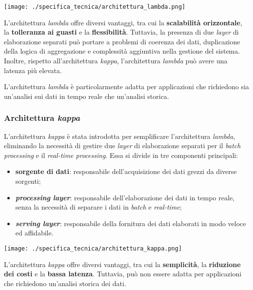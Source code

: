 \begin{center}
	\texttt{[image: ./specifica\_tecnica/architettura\_lambda.png]}
\end{center}

L'architettura \textit{lambda} offre diversi vantaggi, tra cui la \textbf{scalabilità orizzontale}, la \textbf{tolleranza ai guasti} e la \textbf{flessibilità}. Tuttavia, la presenza
di due \textit{layer} di elaborazione separati può portare a problemi di coerenza dei dati, duplicazione della logica di aggregazione e complessità aggiuntiva nella gestione del sistema.
Inoltre, rispetto all'architettura \textit{kappa}, l'architettura \textit{lambda} può avere una latenza più elevata.

L'architettura \textit{lambda} è particolarmente adatta per applicazioni che richiedono sia un'analisi sui dati in tempo reale che un'analisi storica.

\subsubsection{Architettura \textit{kappa}}
L'architettura \textit{kappa} è stata introdotta per semplificare l'architettura \textit{lambda}, eliminando la necessità di gestire due \textit{layer} di elaborazione separati per il \textit{batch processing} e il \textit{real-time processing}.
Essa si divide in tre componenti principali:
\begin{itemize}
	\item \textbf{sorgente di dati}: responsabile dell'acquisizione dei dati grezzi da diverse sorgenti;
	\item \textbf{\textit{processing layer}}: responsabile dell'elaborazione dei dati in tempo reale, senza la necessità di separare i dati in \textit{batch} e \textit{real-time};
	\item \textbf{\textit{serving layer}}: responsabile della fornitura dei dati elaborati in modo veloce ed affidabile.
\end{itemize}

\begin{center}
	\texttt{[image: ./specifica\_tecnica/architettura\_kappa.png]}
\end{center}

L'architettura \textit{kappa} offre diversi vantaggi, tra cui la \textbf{semplicità}, la \textbf{riduzione dei costi} e la \textbf{bassa latenza}.
Tuttavia, può non essere adatta per applicazioni che richiedono un'analisi storica dei dati.

